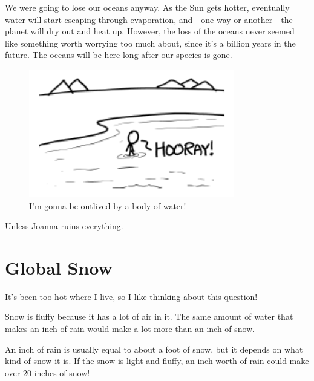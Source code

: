 {{We were going to lose our oceans anyway. As the Sun gets hotter, eventually water will start escaping through evaporation, and—one way or another—the planet will dry out and heat up. However, the loss of the oceans never seemed like something worth worrying too much about, since it's a billion years in the future. The oceans will be here long after our species is gone.}

\begin{figure}[!htbp]
\centering
\includegraphics[scale=0.5, max width=0.8\textwidth]{imgs/a/103/ocean.png}
\caption{I'm gonna be outlived by a body of water!}
\end{figure}

{Unless Joanna ruins everything.}

{
\chapter{Global Snow}
}

\hfill{}

{It's been too hot where I live, so I like thinking about this question!}

{Snow is fluffy because it has a lot of air in it. The same amount of water that makes an inch of rain would make a lot more than an inch of snow.}

{An inch of rain is usually equal to about a foot of snow, but it depends on what kind of snow it is. If the snow is light and fluffy, an inch worth of rain could make over 20 inches of snow!}

}
